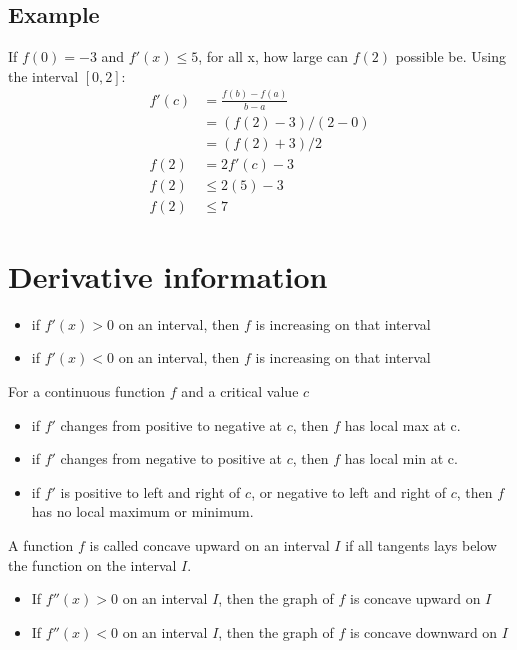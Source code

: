 \documentclass{article}
\theoremstyle{mytheoremstyle}
\theoremstyle{mytheoremstyle}
\theoremstyle{myproblemstyle}
\begin{document}
    \subsection*{Example}
    If $f(0)=-3$ and $f'(x)\le 5$, for all x, how large can $f(2)$ possible be.
    Using the interval $[0,2]$:
    \begin{align*}
        f'(c) &= \frac{f(b)-f(a)}{b-a} \\
              &= (f(2)-3)/(2-0) \\
              &= (f(2)+3)/2 \\
        f(2)  &= 2f'(c) - 3 \\
        f(2)  &\le 2(5) - 3 \\
        f(2)  &\le 7
    \end{align*}

    \section*{Derivative information}
    \begin{itemize}
        \item if $f'(x) > 0$ on an interval, then $f$ is increasing on that
            interval
        \item if $f'(x) < 0$ on an interval, then $f$ is increasing on that
            interval
    \end{itemize}

    For a continuous function $f$ and a critical value $c$
    \begin{itemize}
        \item if $f'$ changes from positive to negative at $c$, then $f$ has
            local max at c.
        \item if $f'$ changes from negative to positive at $c$, then $f$ has
            local min at c.
        \item if $f'$ is positive to left and right of $c$, or negative to left
            and right of $c$, then $f$ has no local maximum or minimum.
    \end{itemize}

    A function $f$ is called concave upward on an interval $I$ if all tangents
    lays below the function on the interval $I$.

    \begin{itemize}
        \item If $f''(x)>0$ on an interval $I$, then the graph of $f$ is
            concave upward on $I$
        \item If $f''(x)<0$ on an interval $I$, then the graph of $f$ is
            concave downward on $I$
    \end{itemize}
\end{document}

